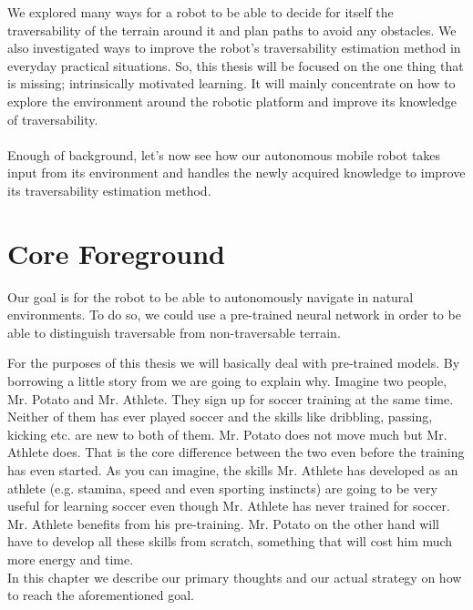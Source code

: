 \documentclass[12pt,a4paper]{report}
\begin{document}
	We explored many ways for a robot to be able to decide for itself the 
	traversability of the terrain around it and plan paths to avoid any obstacles. 
	We also investigated ways to improve the robot's traversability estimation 
	method in everyday practical situations. So, this thesis will be focused on the 
	one thing that is missing; intrinsically motivated learning. It will mainly 
	concentrate on how to explore the environment around the robotic platform and 
	improve its knowledge of traversability.
	\\\\
	
	Enough of background, let’s now see how our autonomous mobile robot takes input 
	from its environment and handles the newly acquired knowledge to improve its 
	traversability estimation method.
	\\
	
	
	\chapter{Core Foreground}
	\label{sec:fg}
	
	Our goal is for the robot to be able to autonomously navigate in natural environments. 
	To do so, we could use a pre-trained neural network in order to be able to distinguish 
	traversable from non-traversable terrain.
	\par
	For the purposes of this thesis we will basically deal with pre-trained models. By
	borrowing a little story from \citet{Gupta} we are going to explain why. Imagine two 
	people, Mr. Potato and Mr. Athlete. They sign up for soccer training at the same time. 
	Neither of them has ever played soccer and the skills like dribbling, passing, 
	kicking etc. are new to both of them. Mr. Potato does not move much but Mr. Athlete 
	does. That is the core difference between the two even before the training has even 
	started. As you can imagine, the skills Mr. Athlete has developed as an athlete 
	(e.g. stamina, speed and even sporting instincts) are going to be very useful for 
	learning soccer even though Mr. Athlete has never trained for soccer. Mr. Athlete 
	benefits from his pre-training. Mr. Potato on the other hand will have to develop all 
	these skills from scratch, something that will cost him much more energy and time.
	\\
	
	In this chapter we describe our primary thoughts and our actual strategy on how to 
	reach the aforementioned goal.
	\\
	
\end{document}
